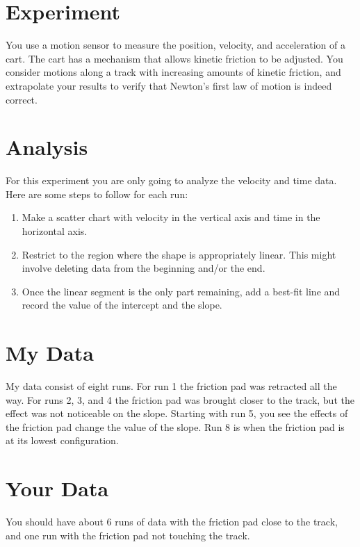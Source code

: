 \section{Experiment}
You use a motion sensor to measure the position, velocity, and acceleration of a cart. The cart has a mechanism that allows kinetic friction to be adjusted. You consider motions along a track with increasing amounts of kinetic friction, and extrapolate your results to verify that Newton's first law of motion is indeed correct.
\section{Analysis}
For this experiment you are only going to analyze the velocity and time data. Here are some steps to follow for each run:
\begin{enumerate}
    \item Make a scatter chart with velocity in the vertical axis and time in the horizontal axis.
    \item Restrict to the region where the shape is appropriately linear. This might involve deleting data from the beginning and/or the end.
    \item Once the linear segment is the only part remaining, add a best-fit line and record the value of the intercept and the slope.
\end{enumerate}
\section{My Data}
My data consist of eight runs. For run 1 the friction pad was retracted all the way. For runs 2, 3, and 4 the friction pad was brought closer to the track, but the effect was not noticeable on the slope. Starting with run 5, you see the effects of the friction pad change the value of the slope. Run 8 is when the friction pad is at its lowest configuration.
\section{Your Data}
You should have about 6 runs of data with the friction pad close to the track, and one run with the friction pad not touching the track.
\newpage
